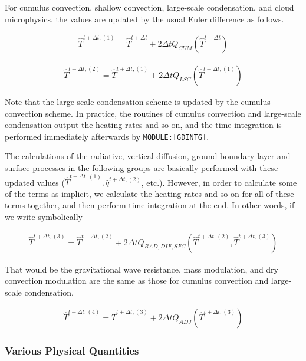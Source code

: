 For cumulus convection, shallow convection, large-scale condensation,
and cloud microphysics, the values are updated by the usual Euler
difference as follows.

\begin{eqnarray}
  \hat{T}^{t+\Delta t,(1)} = \hat{T}^{t+\Delta t}
                         +  2 \Delta t Q_{CUM}(\hat{T}^{t+\Delta t})
\end{eqnarray}

\begin{eqnarray}
  \hat{T}^{t+\Delta t,(2)} = \hat{T}^{t+\Delta t,(1)}
                         +  2 \Delta t Q_{LSC}(\hat{T}^{t+\Delta t,(1)})
\end{eqnarray}

Note that the large-scale condensation scheme is updated by the cumulus
convection scheme. In practice, the routines of cumulus convection and
large-scale condensation output the heating rates and so on, and the
time integration is performed immediately afterwards by
\texttt{MODULE:{[}GDINTG{]}}.

The calculations of the radiative, vertical diffusion, ground boundary
layer and surface processes in the following groups are basically
performed with these updated values
(\(\hat{T}^{t+\Delta t,(1)}, \hat{q}^{t+\Delta t,(2)}\), etc.). However,
in order to calculate some of the terms as implicit, we calculate the
heating rates and so on for all of these terms together, and then
perform time integration at the end. In other words, if we write
symbolically

\begin{eqnarray}
  \hat{T}^{t+\Delta t,(3)} = \hat{T}^{t+\Delta t,(2)}
              + 2 \Delta t Q_{RAD,DIF,SFC}
               (\hat{T}^{t+\Delta t,(2)},\hat{T}^{t+\Delta t,(3)})
\end{eqnarray}

That would be the gravitational wave resistance, mass modulation, and
dry convection modulation are the same as those for cumulus convection
and large-scale condensation.

\begin{eqnarray}
  \hat{T}^{t+\Delta t,(4)} = \hat{T}^{t+\Delta t,(3)}
              +  2 \Delta t Q_{ADJ}(\hat{T}^{t+\Delta t,(3)})
\end{eqnarray}

\hypertarget{various-physical-quantities}{%
\subsubsection{Various Physical
Quantities}\label{various-physical-quantities}}

